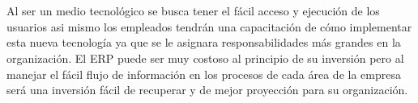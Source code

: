 \\%
\\%
Al ser un medio tecnol\'ogico se busca tener el f\'acil acceso y ejecuci\'on de los usuarios asi mismo los empleados tendr\'an una capacitaci\'on de c\'omo implementar esta nueva tecnolog\'ia ya que se le asignara responsabilidades m\'as grandes en la organizaci\'on. El ERP puede ser muy costoso al principio de su inversi\'on pero al manejar el f\'acil flujo de informaci\'on en los procesos de cada \'area de la empresa ser\'a una inversi\'on f\'acil de recuperar y de mejor proyecci\'on para su organizaci\'on.%